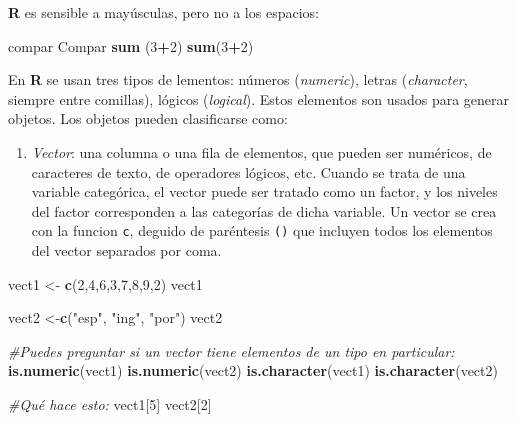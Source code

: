 \documentclass[
]{article}
\newenvironment{Shaded}{\begin{snugshade}}{\end{snugshade}}
\newcommand{\CommentTok}[1]{\textcolor[rgb]{0.56,0.35,0.01}{\textit{#1}}}
\newcommand{\DecValTok}[1]{\textcolor[rgb]{0.00,0.00,0.81}{#1}}
\newcommand{\KeywordTok}[1]{\textcolor[rgb]{0.13,0.29,0.53}{\textbf{#1}}}
\newcommand{\NormalTok}[1]{#1}
\newcommand{\OperatorTok}[1]{\textcolor[rgb]{0.81,0.36,0.00}{\textbf{#1}}}
\newcommand{\StringTok}[1]{\textcolor[rgb]{0.31,0.60,0.02}{#1}}
\providecommand{\tightlist}{%
  \setlength{\itemsep}{0pt}\setlength{\parskip}{0pt}}
\begin{document}
\textbf{R} es sensible a mayúsculas, pero no a los espacios:

\begin{Shaded}
\begin{Highlighting}[]
\NormalTok{compar}
\NormalTok{Compar}
\KeywordTok{sum}\NormalTok{    (}\DecValTok{3}\OperatorTok{+}\DecValTok{2}\NormalTok{)}
\KeywordTok{sum}\NormalTok{(}\DecValTok{3}\OperatorTok{+}\DecValTok{2}\NormalTok{)}
\end{Highlighting}
\end{Shaded}

En \textbf{R} se usan tres tipos de lementos: números (\emph{numeric}),
letras (\emph{character}, siempre entre comillas), lógicos
(\emph{logical}). Estos elementos son usados para generar objetos. Los
objetos pueden clasificarse como:

\begin{enumerate}
\def\labelenumi{\Alph{enumi})}
\tightlist
\item
  \emph{Vector}: una columna o una fila de elementos, que pueden ser
  numéricos, de caracteres de texto, de operadores lógicos, etc. Cuando
  se trata de una variable categórica, el vector puede ser tratado como
  un factor, y los niveles del factor corresponden a las categorías de
  dicha variable. Un vector se crea con la funcion \texttt{c}, deguido
  de paréntesis \texttt{()} que incluyen todos los elementos del vector
  separados por coma.
\end{enumerate}

\begin{Shaded}
\begin{Highlighting}[]
\NormalTok{vect1 <-}\StringTok{ }\KeywordTok{c}\NormalTok{(}\DecValTok{2}\NormalTok{,}\DecValTok{4}\NormalTok{,}\DecValTok{6}\NormalTok{,}\DecValTok{3}\NormalTok{,}\DecValTok{7}\NormalTok{,}\DecValTok{8}\NormalTok{,}\DecValTok{9}\NormalTok{,}\DecValTok{2}\NormalTok{)}
\NormalTok{vect1}

\NormalTok{vect2 <-}\KeywordTok{c}\NormalTok{(}\StringTok{"esp"}\NormalTok{, }\StringTok{"ing"}\NormalTok{, }\StringTok{"por"}\NormalTok{)}
\NormalTok{vect2}

\CommentTok{#Puedes preguntar si un vector tiene elementos de un tipo en particular:}
\KeywordTok{is.numeric}\NormalTok{(vect1)}
\KeywordTok{is.numeric}\NormalTok{(vect2)}
\KeywordTok{is.character}\NormalTok{(vect1)}
\KeywordTok{is.character}\NormalTok{(vect2)}

\CommentTok{#Qué hace esto:}
\NormalTok{vect1[}\DecValTok{5}\NormalTok{]}
\NormalTok{vect2[}\DecValTok{2}\NormalTok{]}
\end{Highlighting}
\end{Shaded}
\end{document}
